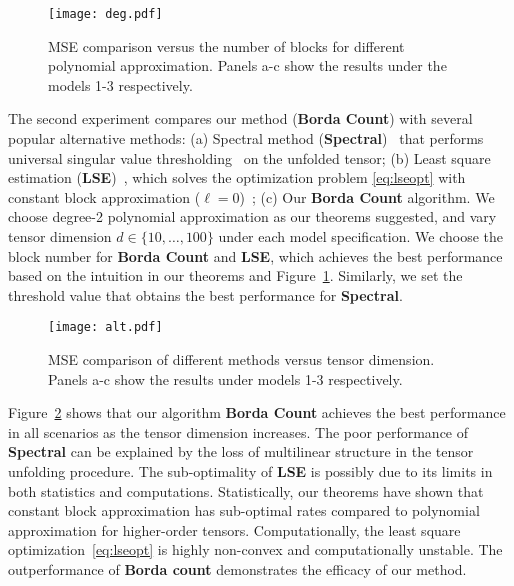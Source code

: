 \documentclass{article}
\theoremstyle{definition}
\begin{document}
\begin{figure}[htp]
    \centering
    \texttt{[image: deg.pdf]}    
    \caption{MSE comparison versus the number of blocks for different polynomial approximation. Panels a-c show the results under the models 1-3 respectively.}
    \label{fig:degk}
    \vspace{-.2cm}
\end{figure}

The second experiment compares our method ({\bf \small Borda Count}) with several popular alternative methods: (a) Spectral method ({\bf \small Spectral})~\citep{xu2018rates} that performs universal singular value thresholding~\citep{chatterjee2015matrix} on the unfolded tensor; (b) Least square estimation ({\bf \small LSE})~\cite{balasubramanian2021nonparametric}, which solves the optimization problem \eqref{eq:lseopt} with constant block approximation ($\ell = 0$)~\citep{gao2016optimal}; (c) Our {\bf \small Borda Count} algorithm. We choose degree-2 polynomial approximation as our theorems suggested, and 
vary tensor dimension $d\in\{10,\ldots,100\}$ under each model specification. We choose the block number for {\bf \small Borda Count} and {\bf \small LSE}, which achieves the best performance based on the intuition in our theorems and Figure~\ref{fig:degk}.  Similarly, we set the threshold value that obtains the best performance for {\bf \small Spectral}. 



\begin{figure}[htp]
    \centering
    \texttt{[image: alt.pdf]}    
    \caption{MSE comparison of different methods versus tensor dimension. Panels a-c show the results under models 1-3 respectively. }
    \label{fig:method}
    \vspace{-.2cm}
\end{figure}



Figure~\ref{fig:method} shows that our algorithm {\bf \small Borda Count} achieves the best performance in all scenarios as the tensor dimension increases. The poor performance of {\bf \small Spectral} can be explained by the loss of multilinear structure in the tensor unfolding procedure. The sub-optimality of {\bf \small LSE} is possibly due to its limits in both statistics and computations. Statistically, our theorems have shown that constant block approximation has sub-optimal rates compared to polynomial approximation for higher-order tensors. Computationally, the least square optimization~\eqref{eq:lseopt} is highly non-convex and computationally unstable. The outperformance of {\bf \small Borda count} demonstrates the efficacy of our method.
\end{document}
